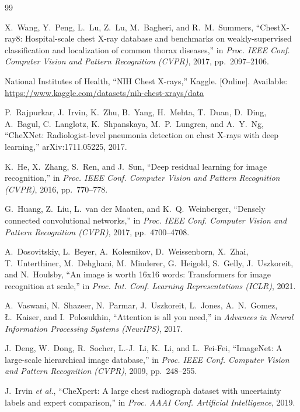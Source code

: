 \documentclass[conference]{IEEEtran}
\begin{document}
\begin{thebibliography}{99}

X.~Wang, Y.~Peng, L.~Lu, Z.~Lu, M.~Bagheri, and R.~M.~Summers, ``ChestX-ray8: Hospital-scale chest X-ray database and benchmarks on weakly-supervised classification and localization of common thorax diseases,'' in \emph{Proc. IEEE Conf. Computer Vision and Pattern Recognition (CVPR)}, 2017, pp.~2097--2106.

National Institutes of Health, ``NIH Chest X-rays,'' Kaggle. [Online]. Available: \url{https://www.kaggle.com/datasets/nih-chest-xrays/data}

P.~Rajpurkar, J.~Irvin, K.~Zhu, B.~Yang, H.~Mehta, T.~Duan, D.~Ding, A.~Bagul, C.~Langlotz, K.~Shpanskaya, M.~P.~Lungren, and A.~Y.~Ng, ``CheXNet: Radiologist-level pneumonia detection on chest X-rays with deep learning,'' arXiv:1711.05225, 2017.

K.~He, X.~Zhang, S.~Ren, and J.~Sun, ``Deep residual learning for image recognition,'' in \emph{Proc. IEEE Conf. Computer Vision and Pattern Recognition (CVPR)}, 2016, pp.~770--778.

G.~Huang, Z.~Liu, L.~van der Maaten, and K.~Q.~Weinberger, ``Densely connected convolutional networks,'' in \emph{Proc. IEEE Conf. Computer Vision and Pattern Recognition (CVPR)}, 2017, pp.~4700--4708.

A.~Dosovitskiy, L.~Beyer, A.~Kolesnikov, D.~Weissenborn, X.~Zhai, T.~Unterthiner, M.~Dehghani, M.~Minderer, G.~Heigold, S.~Gelly, J.~Uszkoreit, and N.~Houlsby, ``An image is worth 16x16 words: Transformers for image recognition at scale,'' in \emph{Proc. Int. Conf. Learning Representations (ICLR)}, 2021.

A.~Vaswani, N.~Shazeer, N.~Parmar, J.~Uszkoreit, L.~Jones, A.~N.~Gomez, {\L}.~Kaiser, and I.~Polosukhin, ``Attention is all you need,'' in \emph{Advances in Neural Information Processing Systems (NeurIPS)}, 2017.

J.~Deng, W.~Dong, R.~Socher, L.-J.~Li, K.~Li, and L.~Fei-Fei, ``ImageNet: A large-scale hierarchical image database,'' in \emph{Proc. IEEE Conf. Computer Vision and Pattern Recognition (CVPR)}, 2009, pp.~248--255.

J.~Irvin \emph{et al.}, ``CheXpert: A large chest radiograph dataset with uncertainty labels and expert comparison,'' in \emph{Proc. AAAI Conf. Artificial Intelligence}, 2019.


\end{thebibliography}
\end{document}
